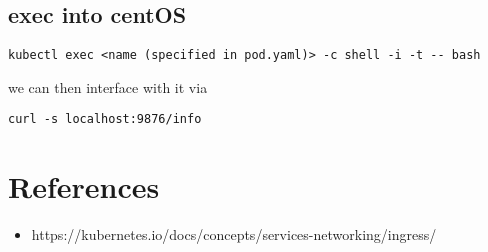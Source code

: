 \documentclass[]{article}
\newcommand{\<}{\guilsinglleft}
\renewcommand{\>}{\guilsinglright}
\begin{document}
\subsection{exec into centOS}
\begin{lstlisting}
kubectl exec <name (specified in pod.yaml)> -c shell -i -t -- bash
\end{lstlisting}
we can then interface with it via 
\begin{lstlisting}
curl -s localhost:9876/info
\end{lstlisting}

\newpage
\section{References}
\begin{itemize}
	\item https://kubernetes.io/docs/concepts/services-networking/ingress/
\end{itemize}
\end{document}
